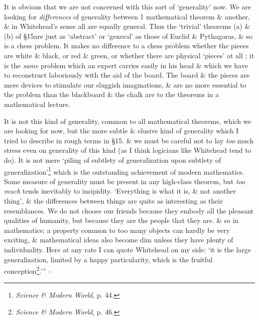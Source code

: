 \documentclass{article}
\numberwithin{equation}{section}
\begin{document}
It is obvious that we are not concerned with this sort of `generality' now. We are looking for \textit{differences} of generality between 1 mathematical theorem \& another, \& in Whitehead's sense all are equally general. Thus the `trivial' theorems (a) \& (b) of \S15are just as `abstract' or `general' as those of Euclid \& Pythagoras, \& so is a chess problem. It makes no difference to a chess problem whether the pieces are white \& black, or red \& green, or whether there are physical `pieces' at all ; it is the \textit{same} problem which an expert carries easily in his head \& which we have to reconstruct laboriously with the aid of the board. The board \& the pieces are mere devices to stimulate our sluggish imaginations, \& are no more essential to the problem than the blackboard \& the chalk are to the theorems in a mathematical lecture.

It is not this kind of generality, common to all mathematical theorems, which we are looking for now, but the more subtle \& elusive kind of generality which I tried to describe in rough terms in \S15. \& we must be careful not to lay \textit{too} much stress even on generality of this kind (as I think logicians like Whitehead tend to do). It is not mere `piling of subtlety of generalization upon subtlety of generalization'\footnote{\textit{Science \& Modern World}, p. 44.} which is the outstanding achievement of modern mathematics. Some measure of generality must be present in any high-class theorem, but \textit{too much} tends inevitably to insipidity. `Everything is what it is, \& not another thing', \& the differences between things are quite as interesting as their resemblances. We do not choose our friends because they embody all the pleasant qualities of humanity, but because they are the people that they are. \& so in mathematics; a property common to too many objects can hardly be very exciting, \& mathematical ideas also become dim unless they have plenty of individuality. Here at any rate I can quote Whitehead on my side: `it is the large generalization, limited by a happy particularity, which is the fruitful conception\footnote{\textit{Science \& Modern World}, p. 46.}.''' -- \cite[pp. 105--109]{Hardy1992}


\printbibliography[heading=bibintoc]
	
\end{document}
